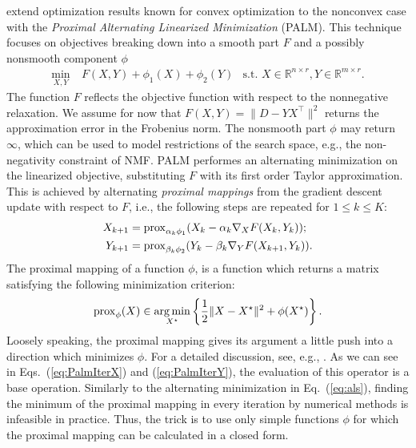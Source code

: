 \cite{bolte2014proximal} extend optimization results known for convex optimization to the nonconvex case with the \emph{Proximal Alternating Linearized Minimization} (PALM). This technique focuses on objectives breaking down into a smooth part $F$ and a possibly nonsmooth component $\phi$
\begin{align}\label{eq:PalmObj}
 \min_{X,Y}&\	F(X,Y)+ \phi_1(X) +\phi_2(Y) &\text{s.t. }X\in\mathbb{R}^{n\times r}, Y\in\mathbb{R}^{m\times r}.
\end{align}
The function $F$ reflects the objective function with respect to the nonnegative relaxation. We assume for now that $F(X,Y)=\|D-YX^\top\|^2$ returns the approximation error in the Frobenius norm. 
The nonsmooth part $\phi$ may return $\infty$, which can be used to model restrictions of the search space, e.g., the non-negativity constraint of NMF. 
PALM performes an alternating minimization on the linearized objective, substituting $F$ with its first order Taylor approximation. This is achieved by alternating \emph{proximal mappings} from the gradient descent update with respect to $F$, i.e., the following steps are repeated for $1\leq k \leq K$:
\begin{align}\label{eq:PalmIterX}
X_{k+1} &= \operatorname{prox}_{\alpha_k\phi_1}(X_k-\alpha_k\nabla_XF(X_k,Y_k));\\
Y_{k+1} &= \operatorname{prox}_{\beta_k\phi_2}(Y_k-\beta_k\nabla_YF(X_{k+1},Y_k)).\label{eq:PalmIterY}
\end{align}
The proximal mapping of a function $\phi$, is a function which returns a matrix satisfying the following minimization criterion: 
\begin{align}\label{eq:prox}
    \operatorname{prox}_\phi(X) \in \operatorname*{arg\,min}_{X^\star}\left\{\frac{1}{2}\|X-X^\star\|^2+\phi(X^\star)\right\}.
\end{align}
Loosely speaking, the proximal mapping gives its argument a little push into a direction which minimizes $\phi$. For a detailed discussion, see, e.g., \citep{parikh2014proximal}. As we can see in Eqs.~(\ref{eq:PalmIterX}) and (\ref{eq:PalmIterY}), the evaluation of this operator is a base operation. Similarly to the alternating minimization in Eq.~(\ref{eq:als}), finding the minimum of the proximal mapping in every iteration by numerical methods is infeasible in practice. Thus, the trick is to use only simple functions $\phi$ for which the proximal mapping can be calculated in a closed form. 

